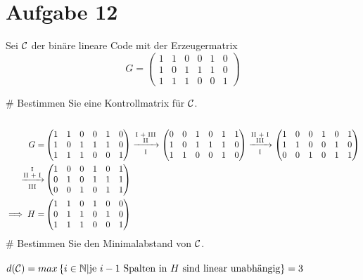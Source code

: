 \section*{Aufgabe 12}
Sei $\mathcal{C}$ der binäre lineare Code mit der Erzeugermatrix
\begin{equation*}
	G = \begin{pmatrix}
		1 & 1 & 0 & 0 & 1 & 0 \\
		1 & 0 & 1 & 1 & 1 & 0 \\
		1 & 1 & 1 & 0 & 0 & 1
	\end{pmatrix}
\end{equation*}
\begin{myList}
#
Bestimmen Sie eine Kontrollmatrix für $\mathcal{C}$.\\\\
\begin{align*}
G=&\begin{pmatrix}
1&1&0&0&1&0\\
1&0&1&1&1&0\\
1&1&1&0&0&1
\end{pmatrix}\lgsto{\rom 1 + \rom 3}{\rom 2}{\rom 1}{}\begin{pmatrix}
0&0&1&0&1&1\\
1&0&1&1&1&0\\
1&1&0&0&1&0
\end{pmatrix}\lgsto{\rom 2 + \rom 1}{\rom 3}{\rom 1}{}\begin{pmatrix}
1&0&0&1&0&1\\
1&1&0&0&1&0\\
0&0&1&0&1&1
\end{pmatrix}\\\lgsto{\rom 1}{\rom 2 + \rom 1}{\rom 3}{}&\begin{pmatrix}
1&0&0&1&0&1\\
0&1&0&1&1&1\\
0&0&1&0&1&1
\end{pmatrix}\\
\implies H=&\begin{pmatrix}
1&1&0&1&0&0\\
0&1&1&0&1&0\\
1&1&1&0&0&1
\end{pmatrix}
\end{align*}
#
Bestimmen Sie den Minimalabstand von $\mathcal{C}$.\\\\
$d(\mathcal{C})=max\left\lbrace i\in\mathbb{N}|\text{je $i-1$ Spalten in $H$ sind linear unabhängig} \right\rbrace=3$
\end{myList}

